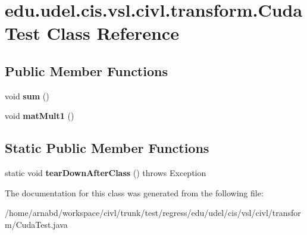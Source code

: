 \hypertarget{classedu_1_1udel_1_1cis_1_1vsl_1_1civl_1_1transform_1_1CudaTest}{}\section{edu.\+udel.\+cis.\+vsl.\+civl.\+transform.\+Cuda\+Test Class Reference}
\label{classedu_1_1udel_1_1cis_1_1vsl_1_1civl_1_1transform_1_1CudaTest}
\subsection*{Public Member Functions}
\begin{DoxyCompactItemize}
\item 
\hypertarget{classedu_1_1udel_1_1cis_1_1vsl_1_1civl_1_1transform_1_1CudaTest_a5425f3aa3fa8455f2897eb2f845df066}{}void {\bfseries sum} ()\label{classedu_1_1udel_1_1cis_1_1vsl_1_1civl_1_1transform_1_1CudaTest_a5425f3aa3fa8455f2897eb2f845df066}

\item 
\hypertarget{classedu_1_1udel_1_1cis_1_1vsl_1_1civl_1_1transform_1_1CudaTest_a6fe09161b4230581904136f7edd4e0aa}{}void {\bfseries mat\+Mult1} ()\label{classedu_1_1udel_1_1cis_1_1vsl_1_1civl_1_1transform_1_1CudaTest_a6fe09161b4230581904136f7edd4e0aa}

\end{DoxyCompactItemize}
\subsection*{Static Public Member Functions}
\begin{DoxyCompactItemize}
\item 
\hypertarget{classedu_1_1udel_1_1cis_1_1vsl_1_1civl_1_1transform_1_1CudaTest_aaa8052ab59b41a70a7489ca9c1d3e609}{}static void {\bfseries tear\+Down\+After\+Class} ()  throws Exception \label{classedu_1_1udel_1_1cis_1_1vsl_1_1civl_1_1transform_1_1CudaTest_aaa8052ab59b41a70a7489ca9c1d3e609}

\end{DoxyCompactItemize}


The documentation for this class was generated from the following file\+:\begin{DoxyCompactItemize}
\item 
/home/arnabd/workspace/civl/trunk/test/regress/edu/udel/cis/vsl/civl/transform/Cuda\+Test.\+java\end{DoxyCompactItemize}
